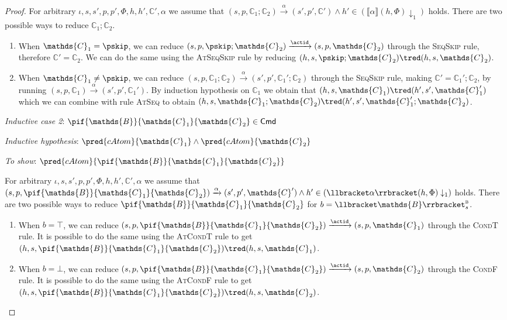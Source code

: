 {\begin{proof}
For arbitrary $\iota, s, s', p, p', \Phi, h, h', \mathds{C}', \alpha$ we assume that $(s, p, \mathds{C}_1 ; \mathds{C}_2) \xrightarrow{\alpha} (s', p', \mathds{C}') \land h' \in \left( \llbracket \alpha \rrbracket(h, \Phi) \downarrow_1 \right)$ holds. There are two possible ways to reduce $\mathds{C}_1 ; \mathds{C}_2$.
\begin{enumerate}
\item When $\mathds{C}_1 = \pskip$, we can reduce $(s, p, \pskip ; \mathds{C}_2) \xrightarrow{\actid} (s, p, \mathds{C}_2)$ through the \textsc{SeqSkip} rule, therefore $\mathds{C}' = \mathds{C}_2$. We can do the same using the \textsc{AtSeqSkip} rule by reducing $(h, s, \pskip ; \mathds{C}_2) \tred (h, s, \mathds{C}_2)$.
\item When $\mathds{C}_1 \neq \pskip$, we can reduce $(s, p, \mathds{C}_1 ; \mathds{C}_2) \xrightarrow{\alpha} (s', p', \mathds{C}_1' ; \mathds{C}_2)$ through the \textsc{SeqSkip} rule, making $\mathds{C}' = \mathds{C}_1'; \mathds{C}_2$, by running $(s, p, \mathds{C}_1) \xrightarrow{\alpha} (s', p', \mathds{C}_1')$. By induction hypothesis on $\mathds{C}_1$ we obtain that $(h, s, \mathds{C}_1) \tred (h', s', \mathds{C}_1')$ which we can combine with rule \textsc{AtSeq} to obtain $(h, s, \mathds{C}_1 ; \mathds{C}_2) \tred (h', s', \mathds{C}_1' ; \mathds{C}_2)$. \\
\end{enumerate}

\textit{Inductive case 2}: $\pif{\mathds{B}}{\mathds{C}_1}{\mathds{C}_2} \in \mathsf{Cmd}$

\textit{Inductive hypothesis}: $\pred{cAtom}{\mathds{C}_1} \land \pred{cAtom}{\mathds{C}_2}$

\textit{To show}: $\pred{cAtom}{\pif{\mathds{B}}{\mathds{C}_1}{\mathds{C}_2}}$

For arbitrary $\iota, s, s', p, p', \Phi, h, h', \mathds{C}', \alpha$ we assume that $(s, p, \pif{\mathds{B}}{\mathds{C}_1}{\mathds{C}_2}) \xrightarrow{\alpha} (s', p', \mathds{C}') \land h' \in \left( \llbracket \alpha \rrbracket(h, \Phi) \downarrow_1 \right)$ holds. There are two possible ways to reduce $\pif{\mathds{B}}{\mathds{C}_1}{\mathds{C}_2}$ for $b = \llbracket \mathds{B} \rrbracket_{s}^{\textsc{b}}$.
\begin{enumerate}
\item When $b = \top$, we can reduce $(s, p, \pif{\mathds{B}}{\mathds{C}_1}{\mathds{C}_2}) \xrightarrow{\actid} (s, p, \mathds{C}_1)$ through the \textsc{CondT} rule. It is possible to do the same using the \textsc{AtCondT} rule to get $(h, s, \pif{\mathds{B}}{\mathds{C}_1}{\mathds{C}_2}) \tred (h, s, \mathds{C}_1)$.
\item When $b = \bot$, we can reduce $(s, p, \pif{\mathds{B}}{\mathds{C}_1}{\mathds{C}_2}) \xrightarrow{\actid} (s, p, \mathds{C}_2)$ through the \textsc{CondF} rule. It is possible to do the same using the \textsc{AtCondF} rule to get $(h, s, \pif{\mathds{B}}{\mathds{C}_1}{\mathds{C}_2}) \tred (h, s, \mathds{C}_2)$.
\end{enumerate}


\end{proof}}
